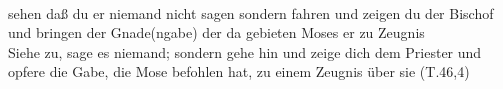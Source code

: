 \begin{exe}
\ex \label{ex:T9827} \gll {}       \object{,}                    \\
{sehen} {daß} {du} {er} {niemand} {nicht} {sagen} {} {sondern} {fahren} {und} {zeigen} {du} {der} {Bischof} {und} {bringen} {der} {Gnade(ngabe)} {der} {da} {gebieten} {Moses} {er} {zu} {Zeugnis} {}\\
\glt Siehe zu, sage es niemand; sondern gehe hin und zeige dich dem Priester und opfere die Gabe, die Mose befohlen hat, zu einem Zeugnis über sie (T.46,4)
\end{exe}
